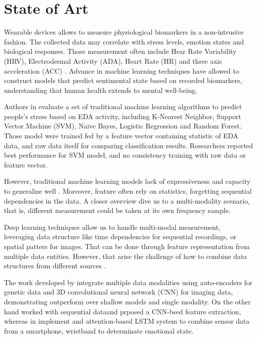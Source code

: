 \section{State of Art}


Wearable devices allows to measure physiological biomarkers in a non-intrusive fashion. The collected data may correlate with stress levels, emotion states and biological responses. Those measurement often include Hear Rate Variability (HRV), Electrodermal Activity (ADA), Heart Rate (HR) and three axis acceleration (ACC) \cite{Vos2023}. Advance in machine learning techniques have allowed to construct models that predict sentimental state based on recorded biomarkers, understanding that human health extends to mental well-being.

Authors in \cite{Zhu2023} evaluate a set of traditional machine learning algorithms to predict people's stress based on EDA activity, including K-Nearest Neighbor, Support Vector Machine (SVM), Naive Bayes, Logistic Regression and Random Forest. Those model were trained fed by a feature vector containing statistic of EDA data, and raw data itself for comparing classification results. Researchers reported best performance for SVM model, and no consistency training with raw data or feature vector.

However, traditional machine learning models lack of expressiveness and capacity to generalize well \cite{Yang2023}. Moreover, feature often rely on statistics, forgetting sequential dependencies in the data. A closer overview dive us to a multi-modality scenario, that is, different measurement could be taken at its own frequency sample.

Deep learning techniques allow us to handle multi-modal measurement, leveraging data structure like time dependencies for sequential recordings, or spatial patters for images. That can be done through feature representation from multiple data entities. However, that arise the challenge of how to combine data structures from different sources \cite{Baltrusaitis2019,Liang2024}. 

The work developed by \cite{Venugopalan2021} integrate multiple data modalities using auto-encoders for genetic data and 3D convolutional neural network (CNN) for imaging data, demonstrating outperform over shallow models and single modality. On the other hand \cite{Wan2020743} worked with sequential dataand prposed a CNN-bsed feature extraction, whereas in \cite{Yang20231082} implement and attention-based LSTM system to combine sensor data from a smartphone, wristband to determinate emotional state.



